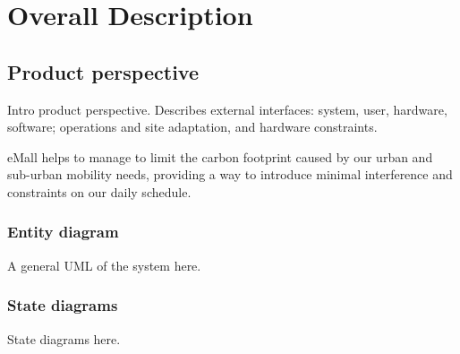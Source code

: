 \section{Overall Description}

\subsection{Product perspective}
Intro product perspective. Describes external interfaces: system,
user, hardware, software; 
operations and site adaptation, and
hardware constraints.

eMall helps to manage to limit the carbon footprint caused by our urban and sub-urban mobility needs,
providing a way to introduce minimal interference and constraints on our daily schedule.

\subsubsection{Entity diagram}
A general UML of the system here.

\subsubsection{State diagrams}
State diagrams here.

